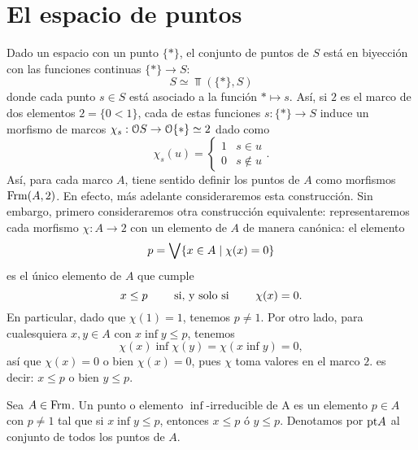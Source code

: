 \section{El espacio de puntos}
Dado un espacio con un punto $\{*\}$, el conjunto de
puntos de $S$ está en biyección con las funciones continuas
$\{*\}\to S$:
\[
  S \simeq \Top(\{*\},S)
\]
donde cada punto $s\in S$ está asociado a la función $*\mapsto
s$.
Así, si $2$ es el marco de dos elementos $2=\{0<1\}$,
cada de estas funciones $s:\{*\}\to S$ induce un morfismo de
marcos $\chi_s:\cal OS\to\cal O\{*\}\simeq 2$ dado como
\[
  \chi_s(u) =
  \begin{cases}
    1 & s\in u \\
    0 & s\not\in u
  \end{cases}
.\]
Así, para cada marco $A$, tiene sentido definir los puntos de $A$
como morfismos $\Frm(A,2)$.
En efecto, más adelante consideraremos esta construcción.
Sin embargo, primero consideraremos otra construcción equivalente:
representaremos cada morfismo $\chi:A\to 2$ con un elemento de
$A$ de manera canónica: el elemento
\[
    p = \Sup\{x\in A\mid \chi(x)=0\}
\]
es el único elemento de $A$ que cumple
\[
    x\leq p \ssi \chi(x) = 0
.\]
En particular, dado que $\chi(1)=1$, tenemos $p\neq 1$.
Por otro lado, para cualesquiera $x,y\in A$ con
$x\inf y\leq p$, tenemos
\[
    \chi(x)\inf\chi(y)=\chi(x\inf y)=0
,\]
así que $\chi(x)=0$ o bien $\chi(x)=0$, pues $\chi$ toma valores
en el marco $2$. es decir: $x\leq p$ o bien $y\leq p$.

\begin{definition}
  Sea $A\in \Frm$. Un punto o elemento $\inf$-irreducible de A es un elemento $p\in A$ con $p\neq 1$ tal que si $x\inf y\leq p$, entonces $x\leq p$ ó $y\leq p$. Denotamos por $\pt A$ al conjunto de todos los puntos de $A$.
\end{definition}


